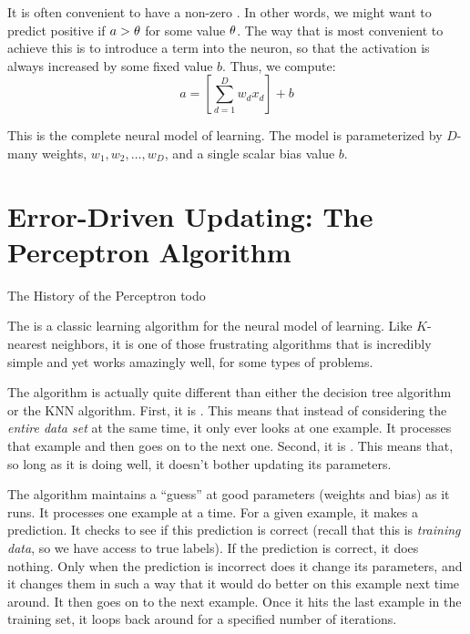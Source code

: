 
It is often convenient to have a non-zero .  In
other words, we might want to predict positive if $a > \theta$ for some
value $\theta$.  The way that is most convenient to achieve this is to
introduce a  term into the neuron, so that the
activation is always increased by some fixed value $b$.  Thus, we
compute:
\begin{equation} \label{eq:perc:sumbias}
a = \left[ \sum_{d=1}^D w_d x_d \right] + b
\end{equation}

This is the complete neural model of learning.  The model is
parameterized by $D$-many weights, $w_1, w_2, \dots, w_D$, and a
single scalar bias value $b$.

\section{Error-Driven Updating: The Perceptron Algorithm}

\begin{vignette}{The History of the Perceptron}
todo
\end{vignette}

The  is a classic learning algorithm for the
neural model of learning.  Like $K$-nearest neighbors, it is one of
those frustrating algorithms that is incredibly simple and yet works
amazingly well, for some types of problems.

The algorithm is actually quite different than either the decision
tree algorithm or the KNN algorithm.  First, it is .
This means that instead of considering the \emph{entire data set} at
the same time, it only ever looks at one example.  It processes that
example and then goes on to the next one.  Second, it is
.  This means that, so long as it is doing well,
it doesn't bother updating its parameters.

The algorithm maintains a ``guess'' at good parameters (weights and
bias) as it runs.  It processes one example at a time.  For a given
example, it makes a prediction.  It checks to see if this prediction
is correct (recall that this is \emph{training data}, so we have
access to true labels).  If the prediction is correct, it does
nothing.  Only when the prediction is incorrect does it change its
parameters, and it changes them in such a way that it would do better
on this example next time around.  It then goes on to the next
example.  Once it hits the last example in the training set, it loops
back around for a specified number of iterations.


